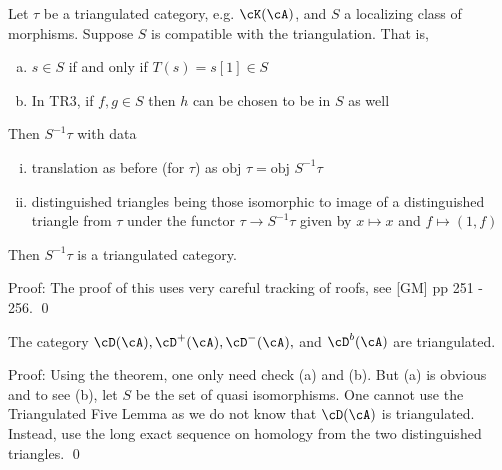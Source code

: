 \begin{thm}
Let $\tau$ be a triangulated category, e.g. $\cK(\cA)$, and $S$ a localizing class of morphisms. Suppose $S$ is compatible with the triangulation. That is, 
\begin{enumerate}[(a)]
\item $s \in S$ if and only if $T(s)=s[1] \in S$
\item In TR3, if $f,g \in S$ then $h$ can be chosen to be in $S$ as well 
\end{enumerate}
Then $S^{-1}\tau$ with data
\begin{enumerate}[(i)]
\item translation as before (for $\tau$) as $\text{obj }\tau=\text{obj }S^{-1}\tau$
\item distinguished triangles being those isomorphic to image of a distinguished triangle from $\tau$ under the functor $\tau \to S^{-1} \tau$ given by $x \mapsto x$ and $f \mapsto (1,f)$
\end{enumerate}
Then $S^{-1}\tau$ is a triangulated category. 
\end{thm}

Proof: The proof of this uses very careful tracking of roofs, see [GM] pp 251 - 256. \qed \\

\begin{cor}
The category $\cD(\cA), \cD^+(\cA), \cD^-(\cA),$ and $\cD^b(\cA)$ are triangulated. 
\end{cor}

Proof: Using the theorem, one only need check (a) and (b). But (a) is obvious and to see (b), let $S$ be the set of quasi isomorphisms. One cannot use the Triangulated Five Lemma as we do not know that $\cD(\cA)$ is triangulated. Instead, use the long exact sequence on homology from the two distinguished triangles. \qed \\




























